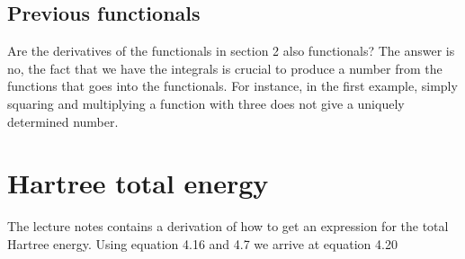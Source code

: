 \documentclass{article}
\begin{document}
	\subsection{Previous functionals}
		Are the derivatives of the functionals in section 2 also functionals? The answer is no, the fact that we have the integrals is crucial to produce a number from the functions that goes into the functionals. For instance, in the first example, simply squaring and multiplying a function with three does not give a uniquely determined number.
	\section{Hartree total energy}
	The lecture notes contains a derivation of how to get an expression for the total Hartree energy. Using equation 4.16 and 4.7 we arrive at equation 4.20
	
\end{document}
